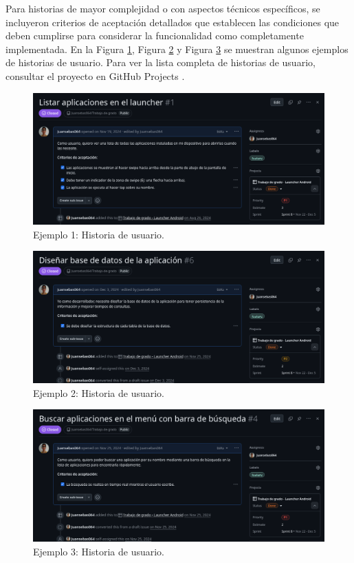Para historias de mayor complejidad o con aspectos técnicos específicos, se incluyeron criterios de aceptación detallados que establecen las condiciones que deben cumplirse para considerar la funcionalidad como completamente implementada. En la Figura \ref{fig:historia_de_usuario_1}, Figura \ref{fig:historia_de_usuario_2} y Figura \ref{fig:historia_de_usuario_3} se muestran algunos ejemplos de historias de usuario. Para ver la lista completa de historias de usuario, consultar el proyecto en GitHub Projects \cite{GithubProjects}.

\begin{figure}[ht]
  \caption{Ejemplo 1: Historia de usuario.}
  \label{fig:historia_de_usuario_1}
  \includegraphics[width=\textwidth]{Figuras/historia_de_usuario_1.png}
  \centering
\end{figure}

\begin{figure}[ht]
  \caption{Ejemplo 2: Historia de usuario.}
  \label{fig:historia_de_usuario_2}
  \includegraphics[width=\textwidth]{Figuras/historia_de_usuario_2.png}
  \centering
\end{figure}

\begin{figure}[ht]
  \caption{Ejemplo 3: Historia de usuario.}
  \label{fig:historia_de_usuario_3}
  \includegraphics[width=\textwidth]{Figuras/historia_de_usuario_3.png}
  \centering
\end{figure}

